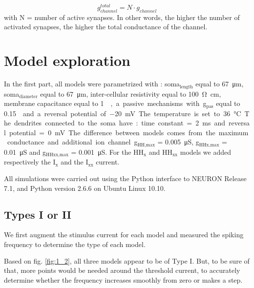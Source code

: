 \documentclass[a4paper, 10pt, conference]{ieeeconf}      %
\begin{document}
$$
g^{total}_{channel} = N \cdot g_{channel}
$$
with N = number of active synapses. In other words, the higher the number of activated synapses, the higher the total conductance of the channel.






\section{Model exploration}
In the first part, all models were parametrized with : soma$_\text{length}$ equal to \SI{67}{\micro\meter}, soma$_\text{diameter}$ equal to \SI{67}{\micro\meter}, inter-cellular resistivity equal to \SI{100}{\ohm\centi\meter}, membrane capacitance equal to \SI{1}{\micro\farad\per\centi\meter\square}, a passive mechanisms with g$_\text{pas}$ equal to \SI{0.15}{\milli\siemens\per\centi\meter\square}  and a reversal potential of \SI{-20}{\milli\volt}. The temperature is set to \SI{36}{\celsius}. The dendrites connected to the soma have : time constant = \SI{2}{\milli\second} and reversal potential = \SI{0}{\milli\volt}. 

The difference between models comes from the maximum conductance and additional ion channel. g$_\text{HH,max}$ = \SI{0.005}{\micro\siemens}, g$_\text{HHx,max}$ = \SI{0.01}{\micro\siemens} and g$_\text{HHxx,max}$ = \SI{0.001}{\micro\siemens}. For the HH$_\text{x}$ and HH$_\text{xx}$ models we added respectively the I$_\text{x}$ and the I$_\text{xx}$ current. 

All simulations were carried out using the Python interface to NEURON Release 7.1, and Python version 2.6.6 on Ubuntu Linux 10.10. \cite{website:neuron}







\subsection{Types I or II}
We first augment the stimulus current for each model and measured the spiking frequency to determine the type of each model.

Based on fig. \ref{fig:1_2}, all three models appear to be of Type I. But, to be sure of that, more points would be needed around the threshold current, to accurately determine whether the frequency increases smoothly from zero or makes a step.
\end{document}
